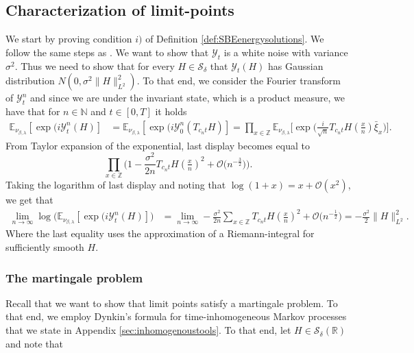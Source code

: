 \documentclass[a4paper, reqno, 12pt]{amsart}
\theoremstyle{plain}
\theoremstyle{definition}
\newcommand{\Z}{\mathbb{Z}}
\newcommand{\N}{\mathbb{N}}
\begin{document}
\subsection{Characterization of limit-points}

We start by proving condition $i)$ of Definition \ref{def:SBEenergysolutions}. We follow the same steps as \cite[Chapter 11, Section 2]{KL99}.
We want to show that $\mathcal{Y}_t$ is a white noise with variance $\sigma^2$. Thus we need to show that  for every $H\in\mathcal{S}_{\delta}$ that $\mathcal Y_t(H)$ has Gaussian distribution  $N(0,\sigma^2\|H\|_{L^2}^2)$. To that end, we consider the Fourier transform of $\mathcal Y^n_t$ and since we are under the invariant state, which is a product measure, we have that for $n\in\N$ and $t\in[0,T]$ it holds
\begin{align*}
     \mathbb E_{\nu_{\beta,\lambda}}[ \exp(i \mathcal Y^n_t(H)] & =\mathbb E_{\nu_{\beta,\lambda}}[ \exp(i \mathcal Y^n_0(T_{c_n t}H)]= \prod_{x\in\Z} \mathbb E_{\nu_{\beta,\lambda}} \bigg[\exp\bigg(\frac{i}{\sqrt{n}} T_{c_n t}H(\tfrac{x}{n}) \bar\xi_x\bigg)\bigg].
\end{align*}
From Taylor expansion of the exponential, last display becomes equal to 
$$
  \prod_{x\in\Z}  \bigg(1- \frac{\sigma^2}{2n} T_{c_n t}H(\tfrac{x}{n})^2 + \mathcal O\Big(n^{-\frac{3}{2}}\Big) \bigg) .$$
  Taking the logarithm of last display and noting that  $\log (1+x) = x + \mathcal O(x^2)$, we get that 
 \begin{align*}
     \lim_{n\to\infty}\log\Big(\mathbb E_{\nu_{\beta,\lambda}}[ \exp(i \mathcal Y^n_t(H)]\Big) 
    & =\lim_{n\to \infty} -\frac{\sigma^2}{2n}\sum_{x\in\Z} T_{c_nt}H(\tfrac{x}{n})^2 + \mathcal O\big(n^{-\frac 12}\big)= -\frac{\sigma^2}{2}\|H\|^2_{L^2}.
\end{align*}
Where the last equality uses the approximation of a Riemann-integral for sufficiently smooth $H$.

\subsubsection{The martingale problem} \label{sec:martingale}

Recall that we want to show that limit points satisfy a martingale problem. To that end, we employ Dynkin's formula for time-inhomogeneous Markov processes that we state in Appendix \ref{sec:inhomogenoustools}. To that end, let $H\in\mathcal S_\delta(\mathbb R)$ and note that
\end{document}
